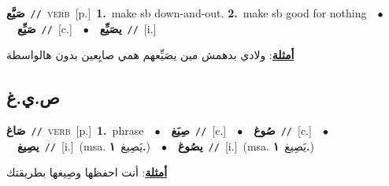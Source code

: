 \documentclass[10pt,a4paper,twoside]{article} %
\begin{document}
\begin{multicols}{2}
{\setlength\topsep{0pt}\textbf{\foreignlanguage{arabic}{صَيَّع}}\ {\color{gray}\texttt{//}\color{black}}\ \textsc{verb}\ [p.]\ \textbf{1.}~make sb down-and-out.  \textbf{2.}~make sb good for nothing\ \ $\bullet$\ \ \setlength\topsep{0pt}\textbf{\foreignlanguage{arabic}{صَيِّع}}\ {\color{gray}\texttt{//}\color{black}}\ [c.]\ \ $\bullet$\ \ \setlength\topsep{0pt}\textbf{\foreignlanguage{arabic}{يصَيِّع}}\ {\color{gray}\texttt{//}\color{black}}\ [i.]\  \begin{flushright}\color{gray}\foreignlanguage{arabic}{\textbf{\underline{\foreignlanguage{arabic}{أمثلة}}}: ولادي بدهمش مين يصَيِّعهم همي صايِعين بدون هالواسطة}\end{flushright}\color{black}} \vspace{2mm}

\vspace{-3mm}
\subsection*{\color{blue}\foreignlanguage{arabic}{ص.ي.غ}\color{blue}{}} 

{\setlength\topsep{0pt}\textbf{\foreignlanguage{arabic}{صَاغ}}\ {\color{gray}\texttt{//}\color{black}}\ \textsc{verb}\ [p.]\ \textbf{1.}~phrase\ \ $\bullet$\ \ \setlength\topsep{0pt}\textbf{\foreignlanguage{arabic}{صِيَغ}}\ {\color{gray}\texttt{//}\color{black}}\ [c.]\ \ $\bullet$\ \ \setlength\topsep{0pt}\textbf{\foreignlanguage{arabic}{صُوغ}}\ {\color{gray}\texttt{//}\color{black}}\ [c.]\ \ $\bullet$\ \ \setlength\topsep{0pt}\textbf{\foreignlanguage{arabic}{يصِيغ}}\ {\color{gray}\texttt{//}\color{black}}\ [i.]\ \color{gray}(msa. \foreignlanguage{arabic}{يَصِيغ}~\foreignlanguage{arabic}{\textbf{١.}})\color{black}\ \ $\bullet$\ \ \setlength\topsep{0pt}\textbf{\foreignlanguage{arabic}{يصُوغ}}\ {\color{gray}\texttt{//}\color{black}}\ [i.]\ \color{gray}(msa. \foreignlanguage{arabic}{يَصِيغ}~\foreignlanguage{arabic}{\textbf{١.}})\color{black}\  \begin{flushright}\color{gray}\foreignlanguage{arabic}{\textbf{\underline{\foreignlanguage{arabic}{أمثلة}}}: أنت احفظها وصِيغها بطريقتك}\end{flushright}\color{black}} \vspace{2mm}


\end{multicols}
\end{document}
